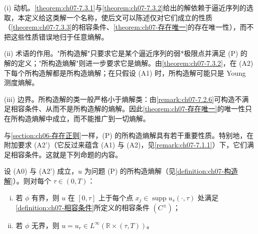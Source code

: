 \documentclass[../../main.tex]{subfiles}%
\begin{document}
\begin{remark}\label{remark:ch07-构造解动机}
(i) 动机。\cref{theorem:ch07-7.3.1}与\cref{theorem:ch07-7.3.2}给出的解依赖于逼近序列的选取，本定义给这类解一个名称，使后文可以陈述仅对它们成立的性质（\cref{theorem:ch07-7.3.3}的相容条件、\cref{theorem:ch07-存在唯一}的存在唯一性），而不把这些性质错误地归于任意熵解。

(ii) 术语的作用。"所构造解"只要求它是某个逼近序列的弱*极限点并满足 (P) 的解的定义；"所构造熵解"则进一步要求它是熵解。由\cref{theorem:ch07-7.3.2}，在 (A2) 下每个所构造解都是所构造熵解；在只假设 (A1) 时，所构造解可能只是 Young 测度熵解。

(iii) 边界。所构造解的类一般严格小于熵解类：由\cref{remark:ch07-7.2.6}可构造不满足相容条件、从而不是所构造解的熵解。因此\cref{theorem:ch07-存在唯一}的唯一性只在所构造熵解中成立，而不能推广到一切熵解。
\end{remark}

与\cref{section:ch06-存在正则}一样，(P) 的所构造熵解具有若干重要性质。特别地，在附加要求 (A2')（它反过来蕴含 (A1) 与 (A2)，见\cref{remark:ch07-7.1.1}）下，它们满足相容条件。这就是下列命题的内容。

\begin{theorem}\label{theorem:ch07-7.3.3}
设 (A0) 与 (A2') 成立，$u$ 为问题 (P) 的所构造熵解（见\cref{definition:ch07-构造解}）。则对每个 $\tau\in(0,T)$：
\begin{enumerate}[(i)]
\item 若 $\phi$ 有界，则 $u$ 在 $[0,\tau]$ 上于每个点 $x_j\in\operatorname{supp}u_s(\cdot,\tau)$ 处满足\cref{definition:ch07-相容条件}所定义的相容条件 $(C^\pm)$；
\item 若 $\phi$ 无界，则 $u=u_r\in L^\infty(\mathbb{R}\times(\tau,T))$。
\end{enumerate}
\end{theorem}
\end{document}
